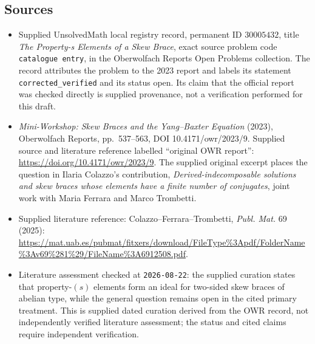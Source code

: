 \documentclass[11pt]{article}
\begin{document}
\subsection{Sources}
\begin{itemize}
\item Supplied UnsolvedMath local registry record, permanent ID \(30005432\), title \emph{The Property-s Elements of a Skew Brace}, exact source problem code \texttt{catalogue entry}, in the Oberwolfach Reports Open Problems collection. The record attributes the problem to the 2023 report and labels its statement \texttt{corrected\_verified} and its status open. Its claim that the official report was checked directly is supplied provenance, not a verification performed for this draft.
\item \emph{Mini-Workshop: Skew Braces and the Yang--Baxter Equation} (2023), Oberwolfach Reports, pp.\ 537--563, DOI 10.4171/owr/2023/9. Supplied source and literature reference labelled ``original OWR report'': \url{https://doi.org/10.4171/owr/2023/9}. The supplied original excerpt places the question in Ilaria Colazzo's contribution, \emph{Derived-indecomposable solutions and skew braces whose elements have a finite number of conjugates}, joint work with Maria Ferrara and Marco Trombetti.
\item Supplied literature reference: Colazzo--Ferrara--Trombetti, \emph{Publ. Mat.} 69 (2025): \url{https://mat.uab.es/pubmat/fitxers/download/FileType%3Apdf/FolderName%3Av69%281%29/FileName%3A6912508.pdf}.
\item Literature assessment checked at \texttt{2026-08-22}: the supplied curation states that property-\((s)\) elements form an ideal for two-sided skew braces of abelian type, while the general question remains open in the cited primary treatment. This is supplied dated curation derived from the OWR record, not independently verified literature assessment; the status and cited claims require independent verification.
\end{itemize}
\end{document}
